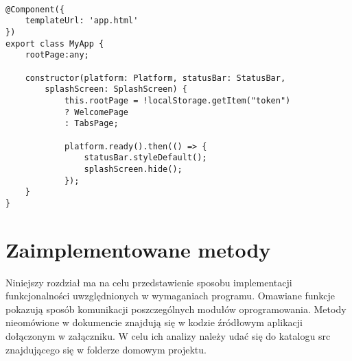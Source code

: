 \newpage
\begin{lstlisting}[caption={Generowanie strony w zależności od tokenu znajdującego sie w pamięci urządzenia.}, label={viewGeneration}]

@Component({
	templateUrl: 'app.html'
})
export class MyApp {
	rootPage:any;
	
	constructor(platform: Platform, statusBar: StatusBar, 
		splashScreen: SplashScreen) {
			this.rootPage = !localStorage.getItem("token")
			? WelcomePage
			: TabsPage;
			
			platform.ready().then(() => {
				statusBar.styleDefault();
				splashScreen.hide();
			});
	}
}
\end{lstlisting}


\section{Zaimplementowane metody}
Niniejszy rozdział ma na celu przedstawienie sposobu implementacji funkcjonalności uwzględnionych w wymaganiach programu. Omawiane funkcje pokazują sposób komunikacji poszczególnych modułów oprogramowania. Metody nieomówione w dokumencie znajdują się w kodzie źródłowym aplikacji dołączonym w załączniku. W celu ich analizy należy udać się do katalogu src znajdującego się w folderze domowym projektu.
\\

